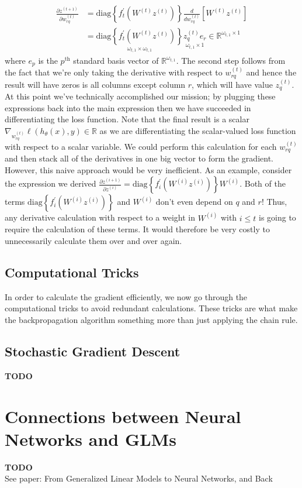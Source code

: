 \documentclass[12pt]{article}
\newcommand{\R}{\mathcal{R}}
\def\R{\mathbb{R}}
\begin{document}
\begin{align*}
\frac{\partial z^{(t + 1)}}{\partial w_{rq}^{(t)}} &= \text{diag}\left\{f_{t}^\prime(W^{(t)}z^{(t)})\right\} \frac{d}{dw_{rq}^{(t)}} \left[W^{(t)} z^{(t)} \right]\\
							          &= \underset{\omega_{t, 1} \times \omega_{t, 1}}{\text{diag}\left\{f_{t}^\prime(W^{(t)}z^{(t)})\right\}}  \underset{\omega_{t, 1} \times 1}{z_q^{(t)} e_r} \in \R^{\omega_{t, 1} \times 1}
\end{align*}
where $e_p$ is the $p^\text{th}$ standard basis vector of $\R^{\omega_{t, 1}}$. The second step follows from the fact that we're only taking the derivative with respect to $w_{rq}^{(t)}$ and hence the result will have zeros
is all columns except column $r$, which will have value $z_q^{(t)}$. At this point we've technically accomplished our mission; by plugging these expressions back into the main expression then we 
have succeeded in differentiating the loss function. Note that the final result is a scalar $\nabla_{w_{rq}^{(t)}} \ell(h_\theta(x), y) \in \R$ as we are differentiating the scalar-valued loss function with respect to 
a scalar variable. We could perform this calculation for each $w_{rq}^{(t)}$ and then stack all of the derivatives in one big vector to form the gradient. However, this naive approach would be very inefficient. As an 
example, consider the expression we derived $\frac{\partial z^{(i + 1)}}{\partial z^{(i)}} = \text{diag}\left\{f_{i}^\prime(W^{(i)}z^{(i)})\right\} W^{(i)}$. Both of the terms $\text{diag}\left\{f_{i}^\prime(W^{(i)}z^{(i)})\right\}$
and $W^{(i)}$ don't even depend on $q$ and $r$! Thus, any derivative calculation with respect to a weight in $W^{(i)}$ with $i \leq t$ is going to require the calculation of these terms. It would therefore be very 
costly to unnecessarily calculate them over and over again. 

\subsection{Computational Tricks}
In order to calculate the gradient efficiently, we now go through the computational tricks to avoid redundant calculations. These tricks are what make the backpropagation algorithm something more than 
just applying the chain rule. 




\subsection{Stochastic Gradient Descent}
\textbf{TODO}


\section{Connections between Neural Networks and GLMs}
\textbf{TODO}\\
See paper: From Generalized Linear Models to Neural Networks, and Back
\end{document}
